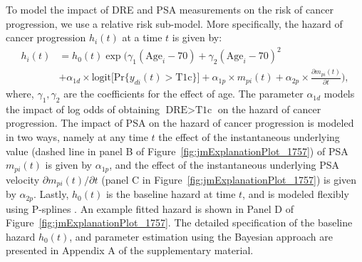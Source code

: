 To model the impact of DRE and PSA measurements on the risk of cancer progression, we use a relative risk sub-model. More specifically, the hazard of cancer progression $h_i(t)$ at a time $t$ is given by:
\begin{equation}
\label{eq:rel_risk_model}
\begin{split}
    h_i(t) &= h_0(t) \exp\Big(\gamma_1 (\mbox{Age}_i-70) + \gamma_2 (\mbox{Age}_i-70)^2\\
    &+\alpha_{1d} \times \mbox{logit} \big[\mbox{Pr}\{y_{di}(t) > \mbox{T1c}\}\big]+ \alpha_{1p} \times m_{pi}(t) + \alpha_{2p} \times \frac{\partial m_{pi}(t)}{\partial {t}}\Big),
    \end{split}
\end{equation}
where, $\gamma_1, \gamma_2$ are the coefficients for the effect of age. The parameter $\alpha_{1d}$ models the impact of log odds of obtaining $\mbox{DRE} > \mbox{T1c}$ on the hazard of cancer progression. The impact of PSA on the hazard of cancer progression is modeled in two ways, namely at any time $t$ the effect of the instantaneous underlying value (dashed line in panel B of Figure~\ref{fig:jmExplanationPlot_1757}) of PSA $m_{pi}(t)$ is given by $\alpha_{1p}$, and the effect of the instantaneous underlying PSA velocity $\partial m_{pi}(t)/\partial {t}$ (panel C in Figure~\ref{fig:jmExplanationPlot_1757}) is given by $\alpha_{2p}$. Lastly, $h_0(t)$ is the baseline hazard at time $t$, and is modeled flexibly using P-splines \citep{eilers1996flexible}. An example fitted hazard is shown in Panel D of Figure~\ref{fig:jmExplanationPlot_1757}. The detailed specification of the baseline hazard $h_0(t)$, and parameter estimation using the Bayesian approach are presented in Appendix A of the supplementary material.

